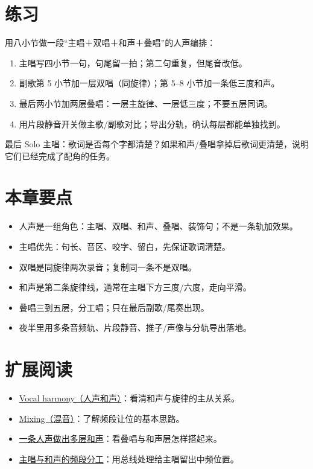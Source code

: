 \section{练习}
\label{sec:vocal-exercise}

\begin{exercise}
用八小节做一段“主唱＋双唱＋和声＋叠唱”的人声编排：
\begin{enumerate}
\item 主唱写四小节一句，句尾留一拍；第二句重复，但尾音改低。
\item 副歌第 5 小节加一层双唱（同旋律）；第 5--8 小节加一条低三度和声。
\item 最后两小节加两层叠唱：一层主旋律、一层低三度；不要五层同词。
\item 用片段静音开关做主歌/副歌对比；导出分轨，确认每层都能单独找到。
\end{enumerate}
最后 Solo 主唱：歌词是否每个字都清楚？如果和声/叠唱拿掉后歌词更清楚，说明它们已经完成了配角的任务。
\end{exercise}

\section{本章要点}
\label{sec:vocal-takeaways}

\begin{itemize}
\item 人声是一组角色：主唱、双唱、和声、叠唱、装饰句；不是一条轨加效果。
\item 主唱优先：句长、音区、咬字、留白，先保证歌词清楚。
\item 双唱是同旋律两次录音；复制同一条不是双唱。
\item 和声是第二条旋律线，通常在主唱下方三度/六度，走向平滑。
\item 叠唱三到五层，分工唱；只在最后副歌/尾奏出现。
\item 夜半里用多条音频轨、片段静音、推子/声像与分轨导出落地。
\end{itemize}

\section{扩展阅读}
\label{sec:09-vocals-further-reading}
\begin{itemize}
  \item \href{https://en.wikipedia.org/wiki/Vocal_harmony}{Vocal harmony（人声和声）}：看清和声与旋律的主从关系。
  \item \href{https://en.wikipedia.org/wiki/Mixing_(music)}{Mixing（混音）}：了解频段让位的基本思路。
  \item \href{https://www.youtube.com/watch?v=ADPbHK3Wi4k}{一条人声做出多层和声}：看叠唱与和声层怎样搭起来。
  \item \href{https://www.youtube.com/watch?v=DSc9i4DpjQE}{主唱与和声的频段分工}：用总线处理给主唱留出中频位置。
\end{itemize}


